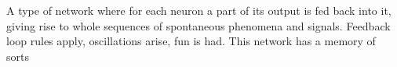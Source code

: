 \documentclass{report}
\begin{document}


{
A type of network where for each neuron a part of its output is fed back into it, giving rise to whole sequences of spontaneous phenomena and signals. Feedback loop rules apply, oscillations arise, fun is had. This network has a memory of sorts
}





	
\end{document}
